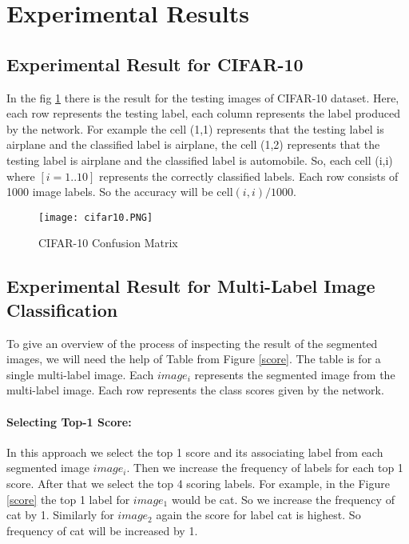 \section{Experimental Results}

\subsection{Experimental Result for CIFAR-10}

In the fig \ref{cifar10conf} there is the result for the testing images of CIFAR-10 dataset. Here, each row represents the testing label, each column represents the label produced by the network. For example the cell (1,1) represents that the testing label is airplane and the classified label is airplane, the cell (1,2) represents that the testing label is airplane and the classified label is automobile. So, each cell (i,i) where $[i = 1..10]$ represents the correctly classified labels. Each row consists of 1000 image labels. So the accuracy will be cell$(i,i)/1000$.

\begin{figure}[h!]
  \centering
  \texttt{[image: cifar10.PNG]}
  \caption{CIFAR-10 Confusion Matrix}\label{cifar10conf}
\end{figure}





\subsection{Experimental Result for Multi-Label Image Classification}
To give an overview of the process of inspecting the result of the segmented images, we will need the help of Table from Figure \ref{score}. The table is for a single multi-label image. Each $image_{i}$ represents the segmented image from the multi-label image. Each row represents the class scores given by the network. 

\paragraph{Selecting Top-1 Score:}
In this approach we select the top 1 score and its associating label from each segmented image $image_{i}$. Then we increase the frequency of labels for each top 1 score. After that we select the top 4 scoring labels. For example, in the Figure \ref{score} the top 1 label for $image_{1}$ would be cat. So we increase the frequency of cat by 1. Similarly for $image_{2}$ again the score for label cat is highest. So frequency of cat will be increased by 1.

